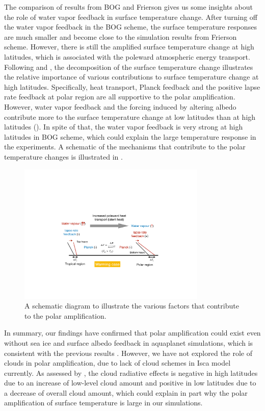 The comparison of results from BOG and Frierson gives us some insights about the role of water vapor feedback in surface temperature change. After turning off the water vapor feedback in the BOG scheme, the surface temperature responses are much smaller and become close to the simulation results from Frierson scheme. However, there is still the amplified surface temperature change at high latitudes, which is associated with the poleward atmospheric energy transport. Following \cite{Feldl2013} and \cite{Kim2018}, the decomposition of the surface temperature change illustrates the relative importance of various contributions to surface temperature change at high latitudes. Specifically, heat transport, Planck feedback and the positive lapse rate feedback at polar region are all supportive to the polar amplification. However, water vapor feedback and the forcing induced by altering albedo contribute more to the surface temperature change at low latitudes than at high latitudes (). In spite of that, the water vapor feedback is very strong at high latitudes in BOG scheme, which could explain the large temperature response in the experiments. A schematic of the mechanisms that contribute to the polar temperature changes is illustrated in .

\begin{figure}[ht]
    \centering
	\includegraphics[width=0.8\textwidth]{figs/polar_amp/pa_dynamic.pdf}
	\caption{A schematic diagram to illustrate the various factors that contribute to the polar amplification.}
	\label{fig:pa_mechanism_schematic}
\end{figure}

In summary, our findings have confirmed that polar amplification could exist even without sea ice and surface albedo feedback in aquaplanet simulations, which is consistent with the previous results \citep{Langen2007,Kim2018,Alexeev2005}. However, we have not explored the role of clouds in polar amplification, due to lack of cloud schemes in Isca model currently. As assessed by \cite{Kim2018}, the cloud radiative effects is negative in high latitudes due to an increase of low-level cloud amount and positive in low latitudes due to a decrease of overall cloud amount, which could explain in part why the polar amplification of surface temperature is large in our simulations. 


